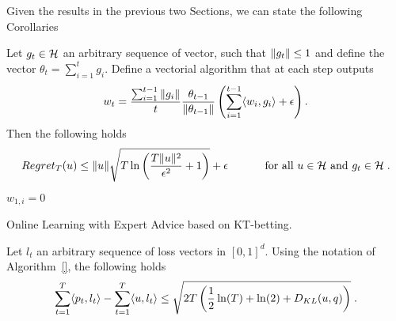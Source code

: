 Given the results in the previous two Sections, we can state the following Corollaries

\begin{cor}
  Let $g_t \in \mathcal{H}$ an arbitrary sequence of vector, such that $\left\|{g_t}\right\| \leq 1$ and define the vector $\theta_t=\sum_{i=1}^{t} g_i$.
  Define a vectorial algorithm that at each step outputs 
  \[
  w_t = \frac{\sum_{i=1}^{t-1} \|g_i\|}{t} \frac{\theta_{t-1}}{\left\|{\theta_{t-1}}\right\|} \left(\sum_{i=1}^{t-1} \langle w_i, g_i \rangle + \epsilon\right).
  \]
  Then the following holds
  \[
    Regret_T(u) \leq \|u\| \sqrt{T \ln \left(\frac{T \|u\|^2}{\epsilon^2}+1\right)}+\epsilon \quad \quad \quad \textnormal{ for all } u \in \mathcal{H} \textnormal{ and } g_t \in \mathcal{H} \; .
  \]
\end{cor}

\begin{algorithm}[h]
  \begin{algorithmic}
  {
     $w_{1,i}=0$
    \ENDFOR
  }
  \end{algorithmic}
  \caption{Online Learning with Expert Advice based on \ac{KT}-betting.}
  \label{alg:kt_expert}
\end{algorithm}

\begin{cor}
Let $l_t$ an arbitrary sequence of loss vectors in $[0,1]^d$. Using the notation of Algorithm~\ref{}, the following holds
\[
\sum_{t=1}^T \langle p_t, l_t\rangle -\sum_{t=1}^T \langle u , l_t\rangle 
\leq \sqrt{2 T \left( \frac{1}{2} \ln(T) + \ln(2) + D_{KL}(u,q)\right)} \; .
\]
\end{cor}